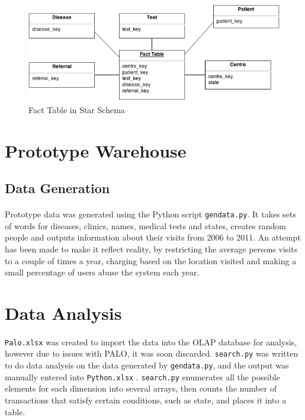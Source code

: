\documentclass[a4paper,12pt,openany]{report}
\begin{document}
\begin{figure}[ht!]
	\centering
	\includegraphics[width=15cm]{schema}
	\caption{Fact Table in Star Schema}
	\label{fig:schema}
\end{figure}

\section*{Prototype Warehouse}
\subsection*{Data Generation}
\paragraph{}
	Prototype data was generated using the Python script \texttt{gendata.py}.
	It takes sets of words for diseases, clinics, names, medical tests and states, creates random people and outputs information about their visits from 2006 to 2011.
	An attempt has been made to make it reflect reality, by restricting the average persons visits to a couple of times a year, charging based on the location visited and making a small percentage of users abuse the system each year.

\section*{Data Analysis}
\paragraph{}
	\texttt{Palo.xlsx} was created to import the data into the OLAP database for analysis, however due to issues with PALO, it was soon discarded.
	\texttt{search.py} was written to do data analysis on the data generated by \texttt{gendata.py}, and the output was manually entered into \texttt{Python.xlsx} .
	\texttt{search.py} enumerates all the possible elements for each dimension into several arrays, then counts the number of transactions that satisfy certain conditions, such as state, and places it into a table.
\end{document}
